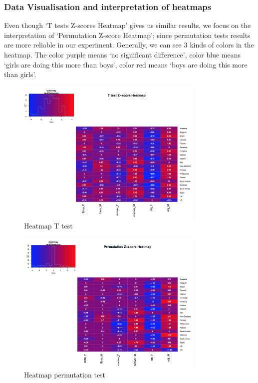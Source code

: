 \documentclass{article}
\begin{document}
	\subsubsection{Data Visualisation and interpretation of heatmaps}
	Even though ‘T tests Z-scores Heatmap’ gives us similar results, we focus on the interpretation of ‘Permutation Z-score Heatmap’; since permutation tests results are more reliable in our experiment. Generally, we can see 3 kinds of colors in the heatmap. The color purple means ‘no significant difference’, color blue means ‘girls are doing this more than boys’, color red means ‘boys are doing this more than girls’.
	
	\begin{figure}[h]
		\centering
		\includegraphics[width=0.8\textwidth]{CatalogHeatmap1}
		\caption{Heatmap T test}
	\end{figure}
	
	\begin{figure}[h]
		\centering
		\includegraphics[width=0.8\textwidth]{CatalogHeatmap2}
		\caption{Heatmap permutation test}
	\end{figure}
	
\end{document}
